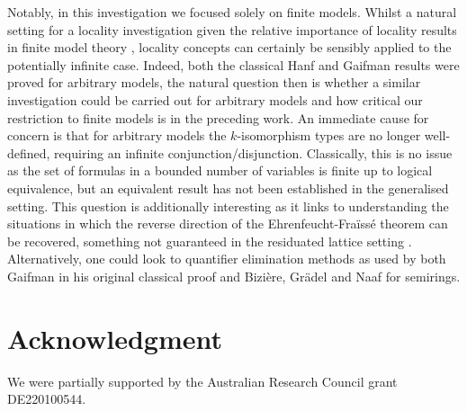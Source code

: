 \documentclass{lmcs} %
\newcommand{\?}{\ensuremath{\mkern0.4\thinmuskip}}
\begin{document}
Notably, in this investigation we focused solely on finite models. Whilst a natural setting for a locality investigation given the relative importance of locality results in finite model theory \cite{EbbinghausFlum95:Finmodeltheory,Libkin04:Elementsfinmod}, locality concepts can certainly be sensibly applied to the potentially infinite case. Indeed, both the classical Hanf \cite{Hanf65:Modeltheory} and Gaifman \cite{Gaifman81:Local} results were proved for arbitrary models, the natural question then is whether a similar investigation could be carried out for arbitrary models and how critical our restriction to finite models is in the preceding work. An immediate cause for concern is that for arbitrary models the $k$-isomorphism types are no longer well-defined, requiring an infinite conjunction/disjunction. Classically, this is no issue as the set of formulas in a bounded number of variables is finite up to logical equivalence, but an equivalent result has not been established in the generalised setting. This question is additionally interesting as it links to understanding the situations in which the reverse direction of the Ehrenfeucht-Fra\"{i}ss\'{e} theorem can be recovered, something not guaranteed in the residuated lattice setting \cite[Example 23]{DellundeGarciaNoguera18:Fuzzybackandforth}. Alternatively, one could look to quantifier elimination methods as used by both Gaifman in his original classical proof and Bizi\`{e}re, Gr\"{a}del and Naaf for semirings.

\section*{Acknowledgment}
We were partially supported by the Australian Research Council grant DE220100544.



\end{document}
